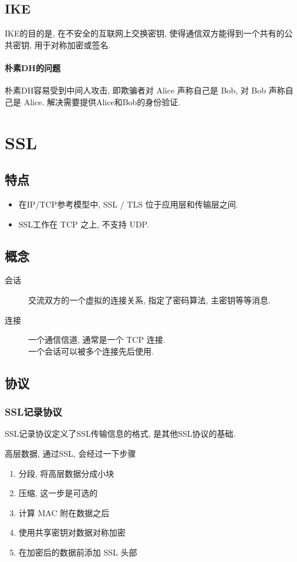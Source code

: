 \documentclass{ctexart}
\begin{document}
\subsection{IKE}
    IKE的目的是, 在不安全的互联网上交换密钥,
    使得通信双方能得到一个共有的公共密钥, 用于对称加密或签名.
\paragraph{朴素DH的问题} 朴素DH容易受到中间人攻击, 
    即欺骗者对 Alice 声称自己是 Bob, 对 Bob 声称自己是 Alice. 解决需要提供Alice和Bob的身份验证.

\section{SSL}
\subsection{特点}
    \begin{itemize}
        \item 在IP/TCP参考模型中, SSL / TLS 位于应用层和传输层之间.
        \item SSL工作在 TCP 之上, 不支持 UDP.
    \end{itemize}
\subsection{概念}
    \begin{description}
        \item[会话] 交流双方的一个虚拟的连接关系, 指定了密码算法, 主密钥等等消息.
        \item[连接] 一个通信信道, 通常是一个 TCP 连接.\\
            一个会话可以被多个连接先后使用.
    \end{description}
\subsection{协议}
\subsubsection{SSL记录协议} SSL记录协议定义了SSL传输信息的格式, 是其他SSL协议的基础.\par
    高层数据, 通过SSL, 会经过一下步骤 \begin{enumerate}
        \item 分段, 将高层数据分成小块
        \item 压缩, 这一步是可选的
        \item 计算 MAC 附在数据之后
        \item 使用共享密钥对数据对称加密
        \item 在加密后的数据前添加 SSL 头部
    \end{enumerate}
\end{document}
